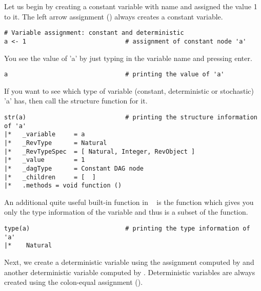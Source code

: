 Let us begin by creating a constant variable with name  and assigned the value 1 to it. 
The left arrow assignment (\cl{<-}) always creates a constant variable.
{\tt \begin{snugshade*}
\begin{lstlisting}    
# Variable assignment: constant and deterministic
a <- 1                           # assignment of constant node 'a'
\end{lstlisting}
\end{snugshade*}}
You see the value of 'a' by just typing in the variable name and pressing enter.
{\tt \begin{snugshade*}
\begin{lstlisting}    
a                                # printing the value of 'a'
\end{lstlisting}
\end{snugshade*}}
If you want to see which type of variable (constant, deterministic or stochastic) 'a' has, then call the structure function for it.
{\tt \begin{snugshade*}
\begin{lstlisting}    
str(a)                           # printing the structure information of 'a'
|*   _variable     = a
|*   _RevType      = Natural
|*   _RevTypeSpec  = [ Natural, Integer, RevObject ]
|*   _value        = 1
|*   _dagType      = Constant DAG node
|*   _children     = [  ]
|*   .methods = void function ()
\end{lstlisting}
\end{snugshade*}}
An additional quite useful built-in function in \RevBayes~ is the  function which gives you only the type information of the variable and thus is a subset of the  function.
{\tt \begin{snugshade*}
\begin{lstlisting}    
type(a)                          # printing the type information of 'a'
|*    Natural
\end{lstlisting}
\end{snugshade*}}
Next, we create a deterministic variable  using the \cl{:=} assignment computed by  and another deterministic variable  computed by . 
Deterministic variables are always created using the colon-equal assignment (\cl{:=}). 

